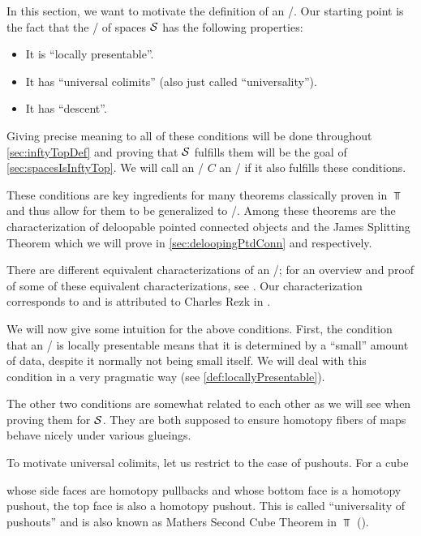 In this section, we want to motivate the definition of an \inftytop/.
Our starting point is the fact that the \inftycat/ of spaces $\mathcal{S}$ has the following properties:
\begin{itemize} 
    \item It is ``locally presentable''.
    \item It has ``universal colimits'' (also just called ``universality'').
    \item It has ``descent''.
\end{itemize}
Giving precise meaning to all of these conditions will be done throughout \cref{sec:inftyTopDef} and proving that $\mathcal{S}$ fulfills them will be the goal of \cref{sec:spacesIsInftyTop}.
We will call an \inftycat/ $C$ an \inftytop/ if it also fulfills these conditions.

These conditions are key ingredients for many theorems classically proven in $\Top$ and thus allow for them to be generalized to \inftytops/.
Among these theorems are the characterization of deloopable pointed connected objects and the James Splitting Theorem which we will prove in \cref{sec:deloopingPtdConn} and \label{jamesSplittingTheorem} respectively.

There are different equivalent characterizations of an \inftytop/; 
for an overview and proof of some of these equivalent characterizations, see \cite[\S 6.1]{HTT}.
Our characterization corresponds to \cite[Theorem 6.1.0.6 (2)]{HTT} and is attributed to Charles Rezk in \cite[\S 6.1.3]{HTT}.

We will now give some intuition for the above conditions.
First, the condition that an \inftycat/ is locally presentable means that it is determined by a ``small'' amount of data, despite it normally not being small itself.
We will deal with this condition in a very pragmatic way (see \cref{def:locallyPresentable}).

The other two conditions are somewhat related to each other as we will see when proving them for $\mathcal{S}$.
They are both supposed to ensure homotopy fibers of maps behave nicely under various glueings.

To motivate universal colimits, let us restrict to the case of pushouts.
For a cube 
\begin{center}
\end{center}
whose side faces are homotopy pullbacks and whose bottom face is a homotopy pushout, the top face is also a homotopy pushout.
This is called ``universality of pushouts'' and is also known as Mathers Second Cube Theorem in $\Top$ (\cite[Theorem 25]{mather_1976}).

